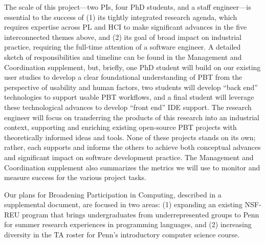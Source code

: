 %
The scale of this project---two PIs, four PhD students, and a staff
engineer---is essential to the success of (1) its
tightly integrated research agenda, which requires expertise across PL and
HCI to make significant advances in the five interconnected themes above, and (2) its
goal of broad impact on industrial
practice, requiring the full-time attention of a software engineer.
%
A detailed sketch of responsibilities and timeline can be found in the
Management and Coordination supplement, but, briefly,
one PhD student will build on our existing user studies to
develop a clear foundational understanding of
PBT from the perspective of usability and human factors, two students
will develop ``back end'' technologies to support usable
PBT workflows, and a final student will leverage these technological
advances to develop ``front end'' IDE support. The
research engineer will focus on transferring the
products of this research into an industrial context, supporting and enriching
existing open-source PBT projects with theoretically informed ideas
and tools. None of these
projects stands on its own; rather, each supports and informs the
others to achieve both conceptual advances and significant
impact on software development practice.
%
The Management and Coordination supplement also summarizes the metrics
we will use to monitor and measure success for the various project
tasks.



Our plans for Broadening Participation in Computing, described in a
supplemental document, are focused in two areas: (1) expanding an
existing NSF-REU program that brings undergraduates from
underrepresented groups to Penn for summer research experiences in
programming languages, and (2) increasing diversity in the TA roster
for Penn's introductory computer science course.

\iflater
{}
\fi

